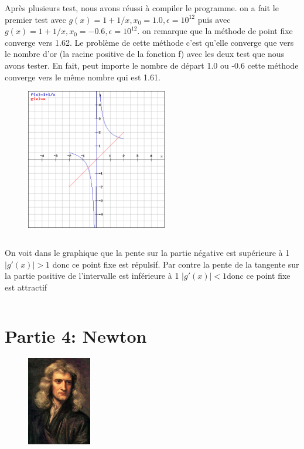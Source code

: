 \documentclass{article}
\begin{document}
 Après plusieurs test, nous avons réussi à compiler le programme. 
	on a fait le premier test avec $g(x) = 1 + 1/x, x_{0} = 1.0, \epsilon = 10^{12}$ puis avec $g(x) = 1 + 1/x, x_{0} = -0.6,  \epsilon = 10^{12}$.
 on remarque que la méthode de point fixe converge vers 1.62.
	Le problème de cette méthode c'est qu'elle converge que vers le nombre d'or (la racine positive de la fonction f) avec les deux test que nous avons tester. En fait, peut importe le nombre de départ 1.0 ou -0.6 cette méthode converge vers le même nombre qui est 1.61.

    \begin{figure}
    \centering
    \includegraphics[width=0.55\textwidth]{graph.png}
\end{figure}
$$ $$


On voit dans le graphique que la pente sur la partie négative est supérieure à 1 $\left|g'(x)\right|> 1$ donc ce point fixe est répulsif.
Par contre la pente de la tangente sur la partie positive de l'intervalle est inférieure à 1 $\left|g'(x)\right|< 1$donc ce point fixe est attractif


    $$ $$
$$ $$
$$ $$
$$ $$
$$ $$
$$ $$
$$ $$




\section{Partie 4: Newton}

\begin{figure}
    \centering
    \includegraphics[width=0.25\textwidth]{image1.jpg}

\end{figure}
$$ $$
\end{document}
